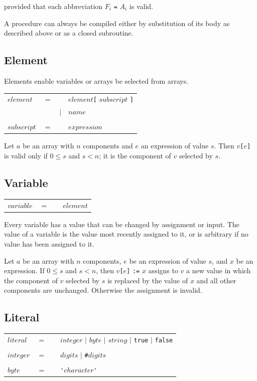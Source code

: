 \documentclass[a4paper, 12pt]{article}
\begin{document}
provided that each abbreviation $F_i$ \verb|=| $A_i$ is valid.

A procedure can always be compiled either by substitution of its body as described above or as a closed
subroutine.

\subsection*{Element}

Elements enable variables or arrays be selected from arrays.

\begin{tabular}{llll}
$element$ & $=$&& $element$\verb|[| $subscript$ \verb|]| \\
                    &&$|$ & $name$\\
\\
$subscript$ & $=$&& $expression$
\end{tabular}   

Let $a$ be an array with $n$ components and $e$ an expression of value $s$.
Then $v$\verb|[|$e$\verb|]| is valid only if $0 \leq s$ and $s<n$; it is the component of $v$ selected by $s$.


\subsection*{Variable}

\begin{tabular}{llll}
$variable$ & $=$&& $element$ 
\end{tabular}   

Every variable has a value that can be changed by assignment or input. The value of a variable is the
value most recently assigned to it, or is arbitrary if no value has been assigned to it. 

Let $a$ be an array with $n$ components, $e$ be an expression of value $s$, and $x$ be an expression. 
If $0 \leq s$ and $s<n$, then $v$\verb|[|$e$\verb|]| \verb|:=| $x$ assigns to $v$ a new value in which the component 
of $v$ selected by $s$ is replaced by the value of $x$ and all other components are unchanged. Otherwise the 
assignment is invalid. 


\subsection*{Literal}

\begin{tabular}{llll}
$literal$ & $=$&& $integer$ $|$ $byte$ $|$ $string$ $|$ \verb|true| $|$ \verb|false| \\
\\
$integer$ & $=$&& $digits$ $|$ \verb|#|$digits$\\
\\
$byte$ & $=$&& \verb|'|$character$\verb|'|
\end{tabular}   
\end{document}
